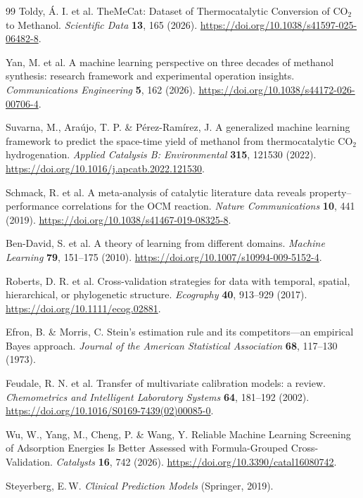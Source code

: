 \begin{thebibliography}{99}\small
{} Toldy, \'A. I. et al. TheMeCat: Dataset of Thermocatalytic Conversion of CO$_2$ to Methanol. \emph{Scientific Data} \textbf{13}, 165 (2026). \url{https://doi.org/10.1038/s41597-025-06482-8}.

 Yan, M. et al. A machine learning perspective on three decades of methanol synthesis: research framework and experimental operation insights. \emph{Communications Engineering} \textbf{5}, 162 (2026). \url{https://doi.org/10.1038/s44172-026-00706-4}.

 Suvarna, M., Ara\'ujo, T. P. \& P\'erez-Ram\'irez, J. A generalized machine learning framework to predict the space-time yield of methanol from thermocatalytic CO$_2$ hydrogenation. \emph{Applied Catalysis B: Environmental} \textbf{315}, 121530 (2022). \url{https://doi.org/10.1016/j.apcatb.2022.121530}.

 Schmack, R. et al. A meta-analysis of catalytic literature data reveals property--performance correlations for the OCM reaction. \emph{Nature Communications} \textbf{10}, 441 (2019). \url{https://doi.org/10.1038/s41467-019-08325-8}.

 Ben-David, S. et al. A theory of learning from different domains. \emph{Machine Learning} \textbf{79}, 151--175 (2010). \url{https://doi.org/10.1007/s10994-009-5152-4}.

 Roberts, D. R. et al. Cross-validation strategies for data with temporal, spatial, hierarchical, or phylogenetic structure. \emph{Ecography} \textbf{40}, 913--929 (2017). \url{https://doi.org/10.1111/ecog.02881}.

 Efron, B. \& Morris, C. Stein's estimation rule and its competitors---an empirical Bayes approach. \emph{Journal of the American Statistical Association} \textbf{68}, 117--130 (1973).

 Feudale, R. N. et al. Transfer of multivariate calibration models: a review. \emph{Chemometrics and Intelligent Laboratory Systems} \textbf{64}, 181--192 (2002). \url{https://doi.org/10.1016/S0169-7439(02)00085-0}.

 Wu, W., Yang, M., Cheng, P. \& Wang, Y. Reliable Machine Learning Screening of Adsorption Energies Is Better Assessed with Formula-Grouped Cross-Validation. \emph{Catalysts} \textbf{16}, 742 (2026). \url{https://doi.org/10.3390/catal16080742}.

 Steyerberg, E.\,W. \emph{Clinical Prediction Models}
(Springer, 2019).


\end{thebibliography}
